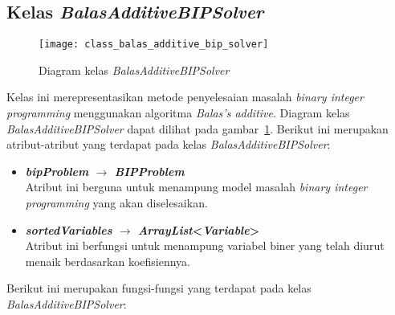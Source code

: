 \subsection{Kelas \textit{BalasAdditiveBIPSolver}}
\begin{figure}[H]
	\centering  
	\texttt{[image: class\_balas\_additive\_bip\_solver]}
	\caption[Diagram kelas \textit{BalasAdditiveBIPSolver}]{Diagram kelas \textit{BalasAdditiveBIPSolver}}
	\label{fig:class_balas_additive_bip_solver}
\end{figure}
Kelas ini merepresentasikan metode penyelesaian masalah \textit{binary integer programming} menggunakan algoritma \textit{Balas's additive}. Diagram kelas \textit{BalasAdditiveBIPSolver} dapat dilihat pada gambar~\ref{fig:class_balas_additive_bip_solver}. Berikut ini merupakan atribut-atribut yang terdapat pada kelas \textit{BalasAdditiveBIPSolver}:
\begin{itemize}
	\item \textbf{\textit{bipProblem} $\rightarrow$ \textit{BIPProblem}}\\
	Atribut ini berguna untuk menampung model masalah \textit{binary integer programming} yang akan diselesaikan.
	\item \textbf{\textit{sortedVariables} $\rightarrow$ \textit{ArrayList}<\textit{Variable}>}\\
	Atribut ini berfungsi untuk menampung variabel biner yang telah diurut menaik berdasarkan koefisiennya.
\end{itemize}
Berikut ini merupakan fungsi-fungsi yang terdapat pada kelas \textit{BalasAdditiveBIPSolver}:
